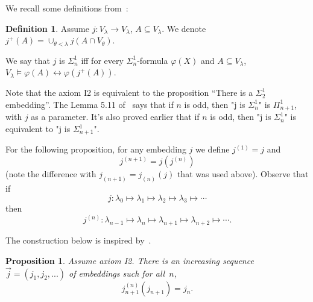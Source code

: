 \documentclass{article}
\newtheorem{proposition}[lemma]{Proposition}
\theoremstyle{definition}
\newtheorem{definition}[lemma]{Definition}
\theoremstyle{remark}
\begin{document}
We recall some definitions from~\cite{dimonte2017i0}:

\begin{definition}
    Assume $j:V_\lambda\rightarrow V_\lambda$, $A\subseteq V_\lambda$. We denote $j^+(A)=\cup_{\theta<\lambda}j(A\cap V_\theta)$.

    We say that $j$ is $\Sigma^1_n$ iff for every $\Sigma^1_n$-formula $\varphi(X)$ and $A\subseteq V_\lambda$, $V_\lambda\vDash \varphi(A)\leftrightarrow \varphi(j^+(A))$.
\end{definition}
Note that the axiom I2 is equivalent to the proposition ``There is a $\Sigma^1_2$ embedding''. The Lemma 5.11 of~\cite{dimonte2017i0} says that if $n$ is odd, then "j is $\Sigma^1_n$" is $\Pi^1_{n+1}$, with $j$ as a parameter. It's also proved earlier that if $n$ is odd, then "j is $\Sigma^1_n$" is equivalent to "j is $\Sigma^1_{n+1}$".


For the following proposition, for any embedding $j$ we define $j^{(1)}=j$ and
  \[
  j^{(n+1)}=j(j^{(n)})
  \]
(note the difference with $j_{(n+1)} = j_{(n)}(j)$ that was used above). Observe that if 
\[
  j:\lambda_0\mapsto \lambda_1\mapsto  \lambda_2 \mapsto \lambda_3 \mapsto \cdots
\]
then 
\[
  j^{(n)} :\lambda_{n-1}\mapsto \lambda_n\mapsto  \lambda_{n+1} \mapsto \lambda_{n+2} \mapsto \cdots.
\]

The construction below is inspired by~\cite{vanname}.



\begin{proposition} \label{prop:the_increasing_sequence_j_1}
  Assume axiom I2. There is an increasing sequence $\vec{j}=(j_1,j_2,...)$ of embeddings such  for all~$n$, 
   \[
   j_{n+1}^{(n)}(j_{n+1})=j_n.
   \]
\end{proposition}
\end{document}
